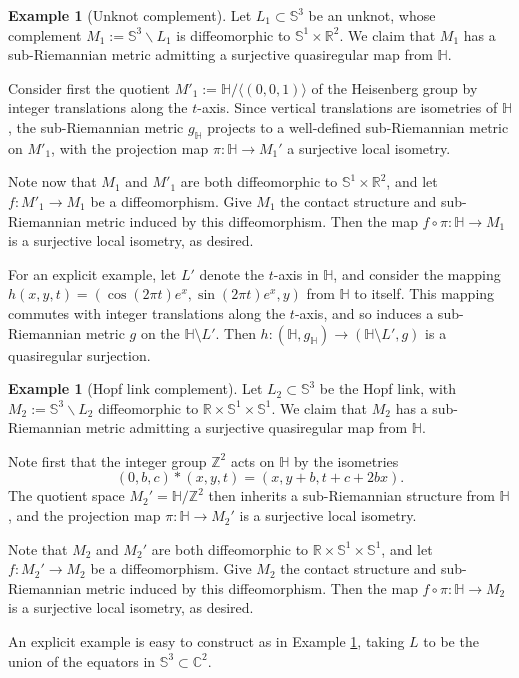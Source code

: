 \documentclass[10pt,letterpaper]{amsart}
\theoremstyle{definition}
\newtheorem{example}[thm]{Example}
\numberwithin{thm}{subsection}
\numberwithin{equation}{section}
\begin{document}
\begin{example}[Unknot complement]
\label{ex:unknot} Let $L_1\subset {\mathbb S}^3$ be an unknot, whose
complement $M_1:={\mathbb S}^3\backslash L_1$ is diffeomorphic to
${\mathbb S}^1\times {\mathbb R}^2$. We claim that $M_1$ has a sub-Riemannian
metric admitting a surjective quasiregular map from ${\mathbb H}$.

Consider first the quotient $M'_1 := {\mathbb H}/\langle (0,0,1)\rangle$ of the Heisenberg
group by integer translations along the $t$-axis. Since vertical translations
are isometries of ${\mathbb H}$, the sub-Riemannian metric
$g_{\mathbb H}$ projects to a well-defined
sub-Riemannian metric
 on $M'_1$, with the projection map $\pi: {\mathbb H} \rightarrow
M_1'$ a surjective local isometry.

Note now that $M_1$ and $M'_1$ are both diffeomorphic to ${\mathbb S}^1\times {\mathbb R}^2$, and let $f: M'_1 \to M_1$ be a diffeomorphism. Give $M_1$ the contact structure and sub-Riemannian metric induced by this diffeomorphism. Then the map $f\circ \pi: {\mathbb H} \rightarrow M_1$ is a surjective local isometry, as desired.

For an explicit example, let $L'$ denote the $t$-axis in ${\mathbb H}$,
 and
consider the mapping $h(x,y,t) = (\cos(2\pi t) e^x, \sin(2\pi t)
e^x, y)$ from ${\mathbb H}$ to itself. This mapping commutes with
integer translations along the $t$-axis, and so induces a
sub-Riemannian metric $g$ on the ${\mathbb H} \setminus L'$. Then
$h:({\mathbb H},g_{\mathbb H}) \to ({\mathbb H}\setminus L',g)$ is a quasiregular
surjection.
\end{example}

\begin{example}[Hopf link complement]
Let $L_2\subset {\mathbb S}^3$ be the Hopf link, with
$M_2:={\mathbb S}^3\backslash L_2$ diffeomorphic to ${\mathbb R}\times {\mathbb S}^1\times
{\mathbb S}^1$. We claim that $M_2$  has a sub-Riemannian metric admitting
a surjective quasiregular map from ${\mathbb H}$.

Note first that the integer group ${\mathbb Z}^2$ acts on ${\mathbb H}$ by the isometries
$$(0,b,c)*(x,y,t) = (x, y+b, t+c+2bx).$$
The quotient space $M_2'={\mathbb H}/{\mathbb Z}^2$ then inherits a sub-Riemannian structure from ${\mathbb H}$, and the projection map $\pi: {\mathbb H} \rightarrow M_2'$ is a surjective local isometry.

Note that $M_2$ and $M_2'$ are both diffeomorphic to
$\mathbb{R}\times {\mathbb S}^1\times {\mathbb S}^1$, and let $f: M_2' \rightarrow
M_2$ be a diffeomorphism. Give $M_2$ the contact structure and
sub-Riemannian metric induced by this diffeomorphism. Then the map
$f\circ \pi: {\mathbb H} \rightarrow M_2$ is a surjective local
isometry, as desired.

An explicit example is easy to construct as in Example \ref{ex:unknot}, taking $L$ to be the union of the equators in ${\mathbb S}^3\subset {\mathbb C}^2$.
\end{example}
\end{document}
